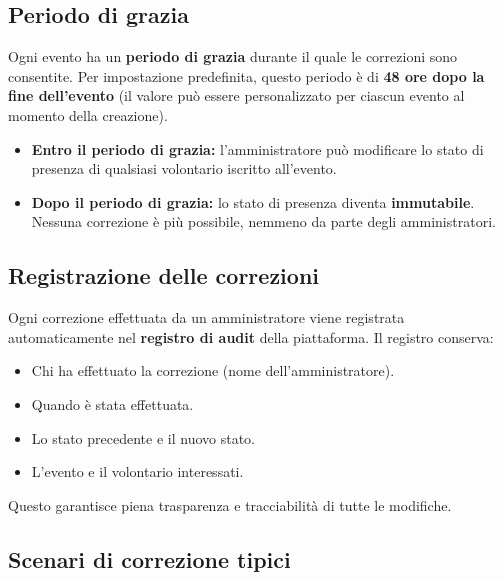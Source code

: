 \documentclass[a4paper,11pt,oneside]{book}
\begin{document}
\subsection{Periodo di grazia}

Ogni evento ha un \textbf{periodo di grazia} durante il quale le correzioni sono consentite. Per impostazione predefinita, questo periodo \`e di \textbf{48 ore dopo la fine dell'evento} (il valore pu\`o essere personalizzato per ciascun evento al momento della creazione).

\begin{itemize}[leftmargin=1.5em]
  \item \textbf{Entro il periodo di grazia:} l'amministratore pu\`o modificare lo stato di presenza di qualsiasi volontario iscritto all'evento.
  \item \textbf{Dopo il periodo di grazia:} lo stato di presenza diventa \textbf{immutabile}. Nessuna correzione \`e pi\`u possibile, nemmeno da parte degli amministratori.
\end{itemize}

\subsection{Registrazione delle correzioni}

Ogni correzione effettuata da un amministratore viene registrata automaticamente nel \textbf{registro di audit} della piattaforma. Il registro conserva:
\begin{itemize}[leftmargin=1.5em]
  \item Chi ha effettuato la correzione (nome dell'amministratore).
  \item Quando \`e stata effettuata.
  \item Lo stato precedente e il nuovo stato.
  \item L'evento e il volontario interessati.
\end{itemize}

Questo garantisce piena trasparenza e tracciabilit\`a di tutte le modifiche.

\subsection{Scenari di correzione tipici}
\end{document}
